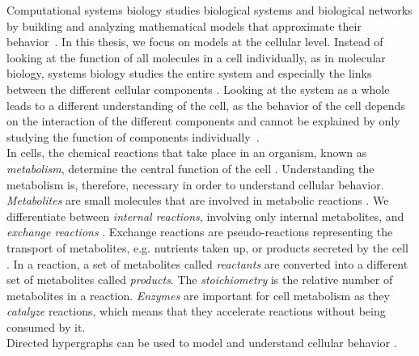 Computational systems biology studies biological systems and biological networks by building and analyzing mathematical models that approximate their behavior~\cite{intro_computational_systems_biology}. In this thesis, we focus on models at the cellular level.
Instead of looking at the function of all molecules in a cell individually, as in molecular biology, systems biology studies the entire system and especially the links between the different cellular components \cite{palsson_systems_biology}. 
Looking at the system as a whole leads to a different understanding of the cell, as the behavior of the cell depends on the interaction of the different components and cannot be explained by only studying the function of components individually~\cite{intro_computational_systems_biology}.\\
In cells, the chemical reactions that take place in an organism, known as \textit{metabolism}, determine the central function of the cell \cite{intro_computational_systems_biology}. Understanding the metabolism is, therefore, necessary in order to understand cellular behavior. 
\textit{Metabolites} are small molecules that are involved in metabolic reactions \cite{intro_computational_systems_biology}. We differentiate between \textit{internal reactions}, involving only internal metabolites, and \textit{exchange reactions}%
. Exchange reactions are pseudo-reactions representing the transport of metabolites, e.g. nutrients taken up, or products secreted by the cell \cite{fba_applications_and_challenges} . 
In a reaction, a set of metabolites called \textit{reactants} are converted into a different set of metabolites called \textit{products}. The \textit{stoichiometry} is the relative number %
of metabolites in a reaction. \textit{Enzymes} are important for cell metabolism as they \textit{catalyze} reactions, which means that they accelerate reactions without being consumed by it.\\
Directed hypergraphs can be used to model and understand cellular behavior \cite{intro_computational_systems_biology}.
